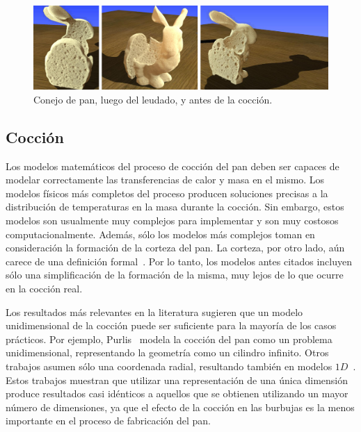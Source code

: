 \documentclass[spanish,a4paper,openright,11pt]{book}
\begin{document}
\begin{figure}
\includegraphics[width=15cm]{figures/prebakebunny}
\caption{Conejo de pan, luego del leudado, y antes de la cocción.}
\label{fg:provingBunny}
\end{figure}

\subsection{Cocción}
Los modelos matemáticos del proceso de cocción del pan deben ser capaces de modelar correctamente las transferencias de calor y masa en el mismo.
Los modelos físicos más completos del proceso producen soluciones precisas a la distribución de temperaturas en la masa durante la cocción.
Sin embargo, estos modelos son usualmente muy complejos para implementar y son muy costosos computacionalmente.
Además, sólo los modelos más complejos toman en consideración la formación de la corteza del pan.
La corteza, por otro lado, aún carece de una definición formal~\cite{Vanin2009}.
Por lo tanto, los modelos antes citados incluyen sólo una simplificación de la formación de la misma, muy lejos de lo que ocurre en la cocción real.

Los resultados más relevantes en la literatura sugieren que un modelo unidimensional de la cocción puede ser suficiente para la mayoría de los casos prácticos.
Por ejemplo, Purlis~\cite{Purlis2011} modela la cocción del pan como un problema unidimensional, representando la geometría como un cilindro infinito.
Otros trabajos asumen sólo una coordenada radial, resultando también en modelos $1D$~\cite{Powathil2004, Thorvaldsson1999}.
Estos trabajos muestran que utilizar una representación de una única dimensión produce resultados casi idénticos a aquellos que se obtienen utilizando un mayor número de dimensiones, ya que el efecto de la cocción en las burbujas es la menos importante en el proceso de fabricación del pan.
\end{document}
